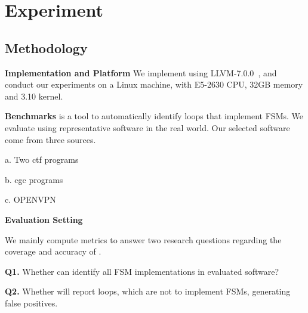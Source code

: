 \section{Experiment}

\subsection{Methodology}


\noindent\textbf{Implementation and Platform} 
We implement \Tool{} using LLVM-7.0.0~\cite{LLVM}, 
and conduct our experiments on a Linux machine, 
with E5-2630 CPU, 32GB memory and 3.10 kernel. 

\noindent\textbf{Benchmarks}
\Tool{} is a tool to automatically identify loops that implement FSMs. 
We evaluate \Tool{} using representative software in the real world. 
Our selected software come from three sources. 

a. Two ctf programs

b. cgc programs 

c. OPENVPN

\noindent\textbf{Evaluation Setting}


We mainly compute metrics to answer two research questions regarding the coverage and accuracy of \Tool{}.

\textbf{Q1.} Whether \Tool{} can identify all FSM implementations in evaluated software?
 
\textbf{Q2.} Whether \Tool{} will report loops, which are not to implement FSMs, 
generating false positives. 

